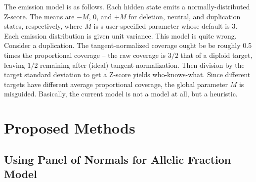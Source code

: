 \documentclass[nofootinbib,amssymb,amsmath]{revtex4}
\begin{document}
The emission model is as follows.  Each hidden state emits a normally-distributed Z-score.  The means are $-M$, 0, and $+M$ for deletion, neutral, and duplication states, respectively, where $M$ is s user-specified parameter whose default is 3.  Each emission distribution is given unit variance.  This model is quite wrong.  Consider a duplication.  The tangent-normalized coverage ought be be roughly 0.5 times the proportional coverage -- the raw coverage is $3/2$ that of a diploid target, leaving $1/2$ remaining after (ideal) tangent-normalization.  Then division by the target standard deviation to get a Z-score yields who-knows-what.  Since different targets have different average proportional coverage, the global parameter $M$ is misguided.  Basically, the current model is not a model at all, but a heuristic.

\section{Proposed Methods} \label{proposed-methods}

\subsection{Using Panel of Normals for Allelic Fraction Model} \label{allelic-PoN}
\end{document}
